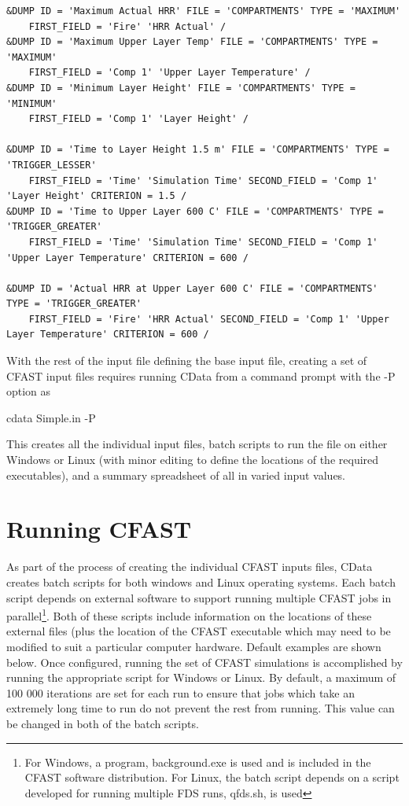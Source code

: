 \documentclass[12pt,twoside]{book}
\begin{document}
\begin{lstlisting}[basicstyle=\scriptsize]
&DUMP ID = 'Maximum Actual HRR' FILE = 'COMPARTMENTS' TYPE = 'MAXIMUM'
    FIRST_FIELD = 'Fire' 'HRR Actual' /
&DUMP ID = 'Maximum Upper Layer Temp' FILE = 'COMPARTMENTS' TYPE = 'MAXIMUM'
    FIRST_FIELD = 'Comp 1' 'Upper Layer Temperature' /
&DUMP ID = 'Minimum Layer Height' FILE = 'COMPARTMENTS' TYPE = 'MINIMUM'
    FIRST_FIELD = 'Comp 1' 'Layer Height' /

&DUMP ID = 'Time to Layer Height 1.5 m' FILE = 'COMPARTMENTS' TYPE = 'TRIGGER_LESSER'
    FIRST_FIELD = 'Time' 'Simulation Time' SECOND_FIELD = 'Comp 1' 'Layer Height' CRITERION = 1.5 /
&DUMP ID = 'Time to Upper Layer 600 C' FILE = 'COMPARTMENTS' TYPE = 'TRIGGER_GREATER'
    FIRST_FIELD = 'Time' 'Simulation Time' SECOND_FIELD = 'Comp 1' 'Upper Layer Temperature' CRITERION = 600 /

&DUMP ID = 'Actual HRR at Upper Layer 600 C' FILE = 'COMPARTMENTS' TYPE = 'TRIGGER_GREATER'
    FIRST_FIELD = 'Fire' 'HRR Actual' SECOND_FIELD = 'Comp 1' 'Upper Layer Temperature' CRITERION = 600 /
\end{lstlisting}

With the rest of the input file defining the base input file, creating a set of CFAST input files requires running CData from a command prompt with the {\ct -P} option as

{\ct cdata Simple.in -P}

This creates all the individual input files, batch scripts to run the file on either Windows or Linux (with minor editing to define the locations of the required executables), and a summary spreadsheet of all in varied input values.

\section{Running CFAST}


As part of the process of creating the individual CFAST inputs files, CData creates batch scripts for both windows and Linux operating systems. Each batch script depends on external software to support running multiple CFAST jobs in parallel\footnote{For Windows, a program, {\ct background.exe} is used and is included in the CFAST software distribution. For Linux, the batch script depends on a script developed for running multiple FDS runs, {\ct qfds.sh}, is used}. Both of these scripts include information on the locations of these external files (plus the location of the CFAST executable which may need to be modified to suit a particular computer hardware. Default examples are shown below. Once configured, running the set of CFAST simulations is accomplished by running the appropriate script for Windows or Linux. By default, a maximum of 100 000 iterations are set for each run to ensure that jobs which take an extremely long time to run do not prevent the rest from running.  This value can be changed in both of the batch scripts. 
\end{document}
